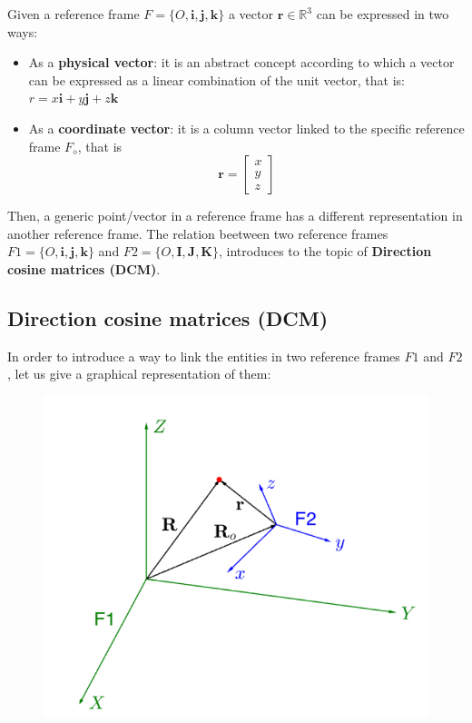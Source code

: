 \noindent
Given a reference frame $F=\{O, \mathbf{i,j,k}\}$ a vector $\mathbf{r}\in\mathbb{R}^3$ can be expressed in two ways: 
\begin{itemize}
    \itemsep0em
    \item As a \textbf{physical vector}: it is an abstract concept according to which a vector can be expressed as a linear combination of the unit vector, that is: $r=x\mathbf{i}+y\mathbf{j}+z\mathbf{k}$
    \item As a \textbf{coordinate vector}: it is a column vector linked to the specific reference frame $F_\diamond$, that is $$\mathbf{r}=\begin{bmatrix}
        x\\y\\z
    \end{bmatrix}$$ 
\end{itemize}

Then, a generic point/vector in a reference frame has a different representation in another reference frame. The relation beetween two reference frames $F1=\{O,\mathbf{i,j,k}\}$ and $F2=\{O, \mathbf{I,J,K}\}$, introduces to the topic of \textbf{Direction cosine matrices (DCM)}.

\subsection{Direction cosine matrices (DCM)}
In order to introduce a way to link the entities in two reference frames $F1$  and $F2$, let us give a graphical representation of them:

\begin{figure}[h]
    \centering
    \includegraphics[scale=0.8]{AerospaceApplications/images/RFs.png}
\end{figure}

